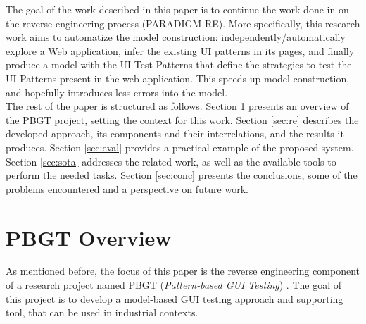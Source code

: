 \documentclass[conference]{IEEEtran}
\begin{document}
\begin{enumerate}
The goal of the work described in this paper is to continue the work done in \cite{nabuco2013inferring} on the reverse engineering process (PARADIGM-RE). More specifically, this research work aims to automatize the model construction: independently/automatically explore a Web application, infer the existing UI patterns in its pages, and finally produce a model with the UI Test Patterns that define the strategies to test the UI Patterns present in the web application. This speeds up model construction, and hopefully introduces less errors into the model.\\

The rest of the paper is structured as follows. Section \ref{sec:pbgt} presents an overview of the PBGT project, setting the context for this work.  Section \ref{sec:re} describes the developed approach, its components and  their interrelations, and the results it produces. Section \ref{sec:eval} provides a practical example of the proposed system. Section \ref{sec:sota} addresses the related work, as well as the available tools to perform the needed tasks. Section \ref{sec:conc} presents the conclusions, some of the problems encountered and a perspective on future work. \\

\section{PBGT Overview}\label{sec:pbgt}

As mentioned before, the focus of this paper is the reverse engineering component of a research project named PBGT (\textit{Pattern-based GUI Testing}) \cite{moreira2013pattern}. The goal of this project is to develop a model-based GUI testing approach and supporting tool, that can be used in industrial contexts.\\


\end{enumerate}
\end{document}
